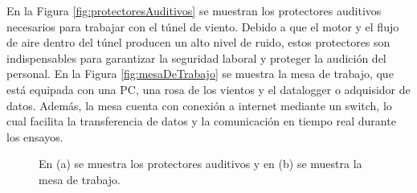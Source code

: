En la Figura \ref{fig:protectoresAuditivos} se muestran los protectores auditivos necesarios para trabajar con el túnel de viento. Debido a que el motor y el flujo de aire dentro del túnel producen un alto nivel de ruido, estos protectores son indispensables para garantizar la seguridad laboral y proteger la audición del personal. En la Figura \ref{fig:mesaDeTrabajo} se muestra la mesa de trabajo, que está equipada con una PC, una rosa de los vientos y el datalogger o adquisidor de datos. Además, la mesa cuenta con conexión a internet mediante un switch, lo cual facilita la transferencia de datos y la comunicación en tiempo real durante los ensayos.

\begin{figure}[H]
    \centering
    \begin{minipage}[b]{0.45\textwidth}
    \end{minipage}
    \hspace{1em} %
    \begin{minipage}[b]{0.45\textwidth}
    \end{minipage}  
    \caption{En (a) se muestra los protectores auditivos y en (b) se muestra la mesa de trabajo.}
    \label{fig:utensiliosParaTunel}
\end{figure}    

